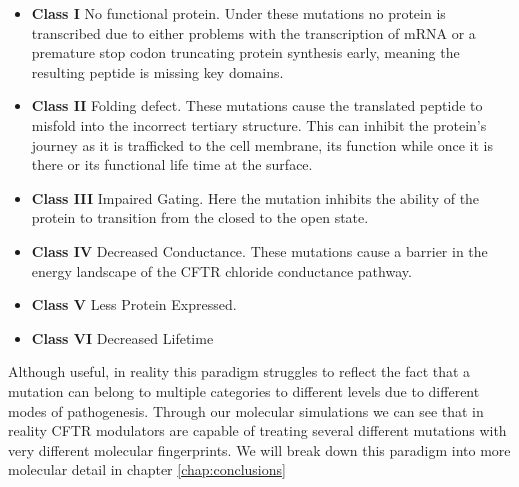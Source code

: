 \begin{itemize}
	\item \textbf{Class I} No functional protein. Under these mutations no protein is transcribed due to either problems with the transcription of mRNA or a premature stop codon truncating protein synthesis early, meaning the resulting peptide is missing key domains. 
	\item \textbf{Class II} Folding defect. These mutations cause the translated peptide to misfold into the incorrect tertiary structure. This can inhibit the protein's journey as it is trafficked to the cell membrane, its function while once it is there or its functional life time at the surface. 
	\item \textbf{Class III} Impaired Gating. Here the mutation inhibits the ability of the protein to transition from the closed to the open state. 
	\item \textbf{Class IV} Decreased Conductance. These mutations cause a barrier in the energy landscape of the CFTR chloride conductance pathway.
	\item \textbf{Class V} Less Protein Expressed.  
	\item \textbf{Class VI} Decreased Lifetime

\end{itemize}

Although useful, in reality this paradigm struggles to reflect the fact that a mutation can belong to multiple categories to different levels due to different modes of pathogenesis. Through our molecular simulations we can see that in reality CFTR modulators are capable of treating several different mutations with very different molecular fingerprints. We will break down this paradigm into more molecular detail in chapter \ref{chap:conclusions}




